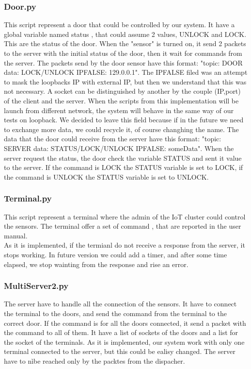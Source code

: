 \subsubsection{Door.py}
This script represent a door that could be controlled by our system. It have a global variable named status , that could assume 2 values, UNLOCK and LOCK.
This are the status of the door. When the "sensor" is turned on,  it send 2 packets to the server with the initial status of the door, then it wait for commands from the server.  The packets send by the door sensor have this format: "topic: DOOR data: LOCK/UNLOCK IPFALSE: 129.0.0.1". The IPFALSE filed was an attempt
to mask the loopbacks IP with external IP, but then we understand that this was not necessary. A socket can be distinguished by another by the couple (IP,port) 
of the client and the server. When the scripts from this implementation will be launch from different network, the system will behave in the same way of  our tests on loopback. We decided to leave this field because if in the future we need to exchange more data, we could recycle it, of course changhing the name.
The data that the door could receive from the server have this format: "topic: SERVER data: STATUS/LOCK/UNLOCK IPFALSE: someData". When the server 
request the status, the door check the variable STATUS and sent it value to the server.  If the command is LOCK the STATUS variable is set to LOCK, if the command is UNLOCK the STATUS variable is set to UNLOCK.


\subsubsection{Terminal.py}
This script represent a terminal where the admin of the IoT cluster could control the sensors. The terminal offer a set of command , that are reported in the user manual.\\
As it is implemented, if the termianl do not receive a response from the server, it stops working.  In future version we could add a timer, and after some time elapsed, we stop wainting from the response and rise an error.

\subsubsection{MultiServer2.py}
The server have to handle all the connection of the sensors. It have to connect the terminal to the doors, and send the command from the terminal to the correct door. If the command is for all the doors connected, it send a packet with the command to all of them. It have a list of sockets of the doors and a list for the socket of the terminals. As it is implemented, our system work with only one terminal connected to the server, but this could be ealisy changed. The server have to nìbe reached only by the packtes from the dispacher. 


